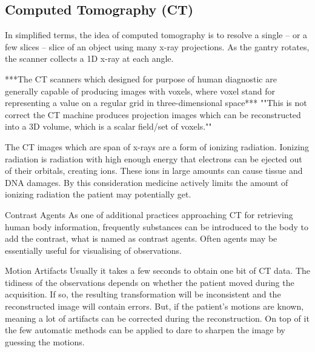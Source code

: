 \subsection{Computed Tomography (CT)}
In simplified terms, the idea of computed tomography is to resolve a single -- or a few slices -- slice of an object using many x-ray projections. As the gantry rotates, the scanner collects a 1D x-ray at each angle.

***The CT scanners which designed for purpose of human diagnostic are generally capable of producing images with voxels, where voxel stand for representing a value on a regular grid in three-dimensional space*** ""This is not correct the CT machine produces projection images which can be reconstructed into a 3D volume, which is a scalar field/set of voxels.""

The CT images which are span of x-rays are a form of ionizing radiation. Ionizing radiation is radiation with high enough energy that electrons can be ejected out of their orbitals, creating ions. These ions in large amounts can cause tissue and DNA damages. By this consideration medicine actively limits the amount of ionizing radiation the patient may potentially get.

\item Contrast Agents
\newline
As one of additional practices approaching CT for retrieving human body information, frequently substances can be introduced to the body to add the contrast, what is named as contrast agents. Often agents may be essentially useful for visualising of observations.          

\item Motion Artifacts
\newline
Usually it takes a few seconds to obtain one bit of CT data. The tidiness of the observations depends on whether the patient moved during the acquisition. If so, the resulting transformation will be inconsistent and the reconstructed image will contain errors. But, if the patient's motions are known, meaning a lot of artifacts can be corrected during the reconstruction. On top of it the few automatic methods can be applied to dare to sharpen the image by guessing the motions.

